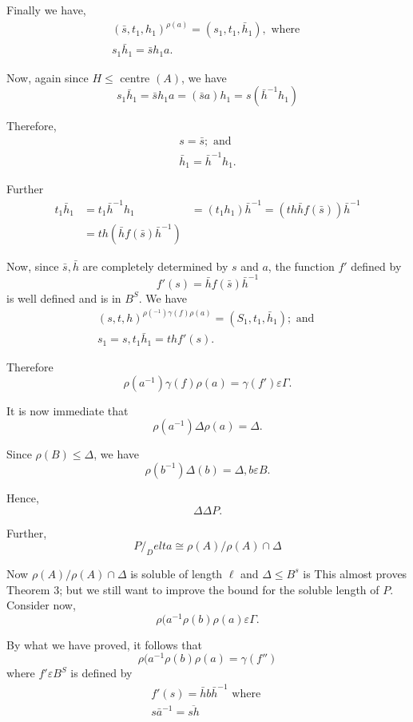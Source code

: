 Finally we have,
\begin{gather*}
  (\bar{s},  t_1,  h_1)^{\rho (a)} = (s_1, t_1, \bar{h}_1),  \text{ where } \\
  s_1 \bar{h}_1 =\bar{s} h_1 a.
\end{gather*}

Now,  again since $H \le $ centre  $(A)$, we have 
$$
s_1 \bar{h}_1 =\bar{s}h_1 a = (\bar{s} a)h_1 = s(\bar{h}^{-1} h_1)
$$

Therefore,
\begin{gather*}
  s= \bar{s} ; \text{ and } \\
  \bar{h}_1 =  \bar{h}^{-1}h_1.
\end{gather*}

Further
\begin{align*}
  t_1 \bar{h}_1 &= t_1 \bar{h}^{-1}h_1
  &= (t_1 h_1) \bar{h}^{-1} = (th\bar{h}f (\bar{s})) \bar{h}^{-1} \\
  &= th(\bar{h}f(\bar{s}) \bar{h}^{-1})
\end{align*}

Now, since $\bar{s},\bar{h}$ are completely determined by $s$ and $a$,
the function $f'$ defined by  
$$
f'(s)= \bar{h}f(\bar{s}) \bar{h}^{-1}
$$ 
is well defined and is in $B^S$. We have 
\begin{gather*}
  (s,t,h) ^{\rho (^{-1}) \gamma (f) \rho (a)} =  (S_1, t_1, \bar{h}_1)
  ; \text{ and } \\ 
  s_1 = s, t_1 \bar{h}_1 = thf' (s). 
\end{gather*}

Therefore 
$$
\rho(a^{-1}) \gamma (f) \rho (a) = \gamma (f') \varepsilon \Gamma.
$$

It is now immediate that 
$$
\rho(a^{-1}) \Delta \rho (a) = \Delta. 
$$

Since $\rho (B) \le \Delta$, we have 
$$
\rho (b^{-1}) \Delta (b) = \Delta, b \varepsilon B.
$$

Hence,
$$
\Delta \Delta P.
$$

Further,
$$
P/ _Delta \cong \rho (A) / \rho (A) \cap \Delta
$$

Now $\rho (A) / \rho (A) \cap \Delta$ is soluble of length $\ell$ and
$\Delta \le B^s$ is This almost proves Theorem $3$; but we still want
to improve the bound for the soluble length of $P$. Consider now, 
$$
\rho(a^{-1} \rho (b) \rho (a) \varepsilon \Gamma.
$$

By what we have proved, it follows that 
$$
\rho(a^{-1} \rho (b) \rho (a) = \gamma (f'')
$$
where $f' \varepsilon B^S$ is defined by 
\begin{gather*}
  f'(s) = \bar{h} b \bar{h}^{-1} \text{ where }\\
  s \bar{a}^{-1} = \overline{sh}
\end{gather*}

